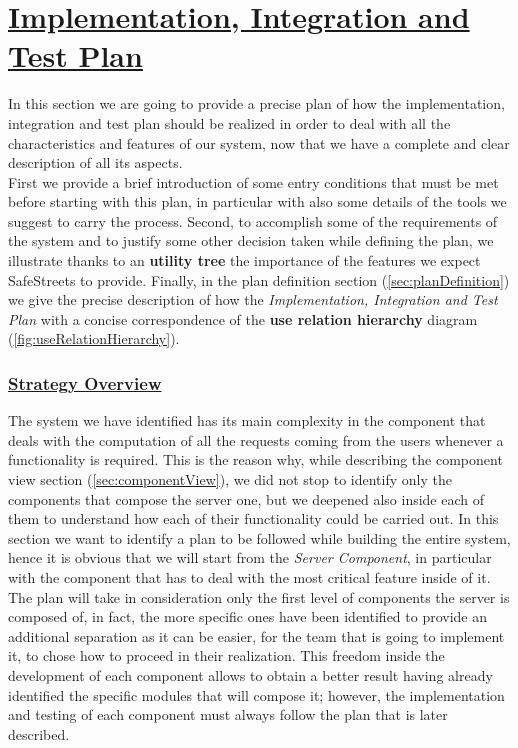 \section[Implementation, Integration and Test Plan]{\hyperlink{toc}{Implementation, Integration and Test Plan}}
	\label{sec:iitPlan}
	
	In this section we are going to provide a precise plan of how the implementation, integration and test plan should be realized in order to deal with all the characteristics and features of our system, now that we have a complete and clear description of all its aspects.\\
	
	First we provide a brief introduction of some entry conditions that must be met before starting with this plan, in particular with also some details of the tools we suggest to carry the process. Second, to accomplish some of the requirements of the system and to justify some other decision taken while defining the plan, we illustrate thanks to an \textbf{utility tree} the importance of the features we expect SafeStreets to provide. Finally, in the plan definition section (\ref{sec:planDefinition}) we give the precise description of how the \emph{Implementation, Integration and Test Plan} with a concise correspondence of the \textbf{use relation hierarchy} diagram (\autoref{fig:useRelationHierarchy}).
	
	\subsubsection[Strategy Overview]{\hyperlink{toc}{Strategy Overview}}
		\label{sec:strategyOverview}
		
		The system we have identified has its main complexity in the component that deals with the computation of all the requests coming from the users whenever a functionality is required. This is the reason why, while describing the component view section (\ref{sec:componentView}), we did not stop to identify only the components that compose the server one, but we deepened also inside each of them to understand how each of their functionality could be carried out. In this section we want to identify a plan to be followed while building the entire system, hence it is obvious that we will start from the \emph{Server Component}, in particular with the component that has to deal with the most critical feature inside of it. The plan will take in consideration only the first level of components the server is composed of, in fact, the more specific ones have been identified to provide an additional separation as it can be easier, for the team that is going to implement it, to chose how to proceed in their realization. This freedom inside the development of each component allows to obtain a better result having already identified the specific modules that will compose it; however, the implementation and testing of each component must always follow the plan that is later described.\\
		
